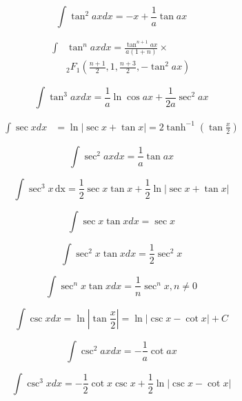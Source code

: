 \documentclass[11pt,twoside]{article}
\begin{document}
\begin{multicols}{3}
\begin{footnotesize}
\begin{equation}
\int \tan^2 ax dx = -x + \frac{1}{a} \tan ax 
\end{equation}

\begin{align}
\int &\tan^n ax dx = 
\frac{\tan^{n+1} ax }{a(1+n)} \times \nonumber \\ &
 {_2}F_1\left( \frac{n+1}{2}, 
1, \frac{n+3}{2}, -\tan^2 ax \right) 
\end{align}

\begin{equation}
\int \tan^3 ax dx = \frac{1}{a} \ln \cos ax + \frac{1}{2a}\sec^2 ax 
\end{equation}

\begin{align}
\int \sec x dx &= \ln | \sec x + \tan x | = 2 \tanh^{-1} \left (\tan \frac{x}{2} \right) 
\end{align}

\begin{equation}
\int \sec^2 ax dx = \frac{1}{a} \tan ax 
\end{equation}

\begin{equation}
\int \sec^3 x \hspace{2pt}\text{dx} = \frac{1}{2} \sec x \tan x + \frac{1}{2}\ln | \sec x + \tan x |
\end{equation}

\begin{equation}
\int \sec x \tan x dx = \sec x 
\end{equation}

\begin{equation}
\int \sec^2 x \tan x dx = \frac{1}{2} \sec^2 x 
\end{equation}

\begin{equation}
\int \sec^n x \tan x dx = \frac{1}{n} \sec^n x , n\ne 0
\end{equation}

\begin{equation}
\int \csc x dx = \ln \left | \tan \frac{x}{2} \right|  = \ln | \csc x - \cot x| + C
\end{equation}

\begin{equation}
\int \csc^2 ax dx = -\frac{1}{a} \cot ax 
\end{equation}

\begin{equation}
\int \csc^3 x dx = -\frac{1}{2}\cot x \csc x + \frac{1}{2} \ln | \csc x - \cot x | 
\end{equation}


\end{footnotesize}
\end{multicols}
\end{document}
